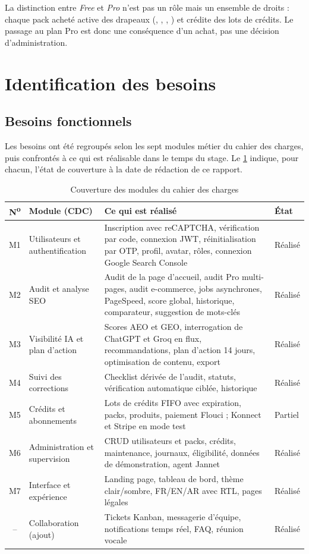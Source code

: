 La distinction entre \textit{Free} et \textit{Pro} n'est pas un rôle mais un ensemble de droits : chaque pack acheté active des drapeaux (, , , ) et crédite des lots de crédits. Le passage au plan Pro est donc une conséquence d'un achat, pas une décision d'administration.

\section{Identification des besoins}

\subsection{Besoins fonctionnels}
Les besoins ont été regroupés selon les sept modules métier du cahier des charges, puis confrontés à ce qui est réalisable dans le temps du stage. Le \cref{tab-modules-cdc} indique, pour chacun, l'état de couverture à la date de rédaction de ce rapport.

\begin{table}[htbp]
\centering
\small
\caption{Couverture des modules du cahier des charges}\label{tab-modules-cdc}
\begin{tabularx}{\textwidth}{@{}clXl@{}}
\toprule
\textbf{N\textsuperscript{o}} & \textbf{Module (CDC)} & \textbf{Ce qui est réalisé} & \textbf{État}\\
\midrule
M1 & Utilisateurs et authentification & Inscription avec reCAPTCHA, vérification par code, connexion JWT, réinitialisation par OTP, profil, avatar, rôles, connexion Google Search Console & Réalisé\\
M2 & Audit et analyse SEO & Audit de la page d'accueil, audit Pro multi-pages, audit e-commerce, jobs asynchrones, PageSpeed, score global, historique, comparateur, suggestion de mots-clés & Réalisé\\
M3 & Visibilité IA et plan d'action & Scores AEO et GEO, interrogation de ChatGPT et Groq en flux, recommandations, plan d'action 14 jours, optimisation de contenu, export & Réalisé\\
M4 & Suivi des corrections & Checklist dérivée de l'audit, statuts, vérification automatique ciblée, historique & Réalisé\\
M5 & Crédits et abonnements & Lots de crédits FIFO avec expiration, packs, produits, paiement Flouci ; Konnect et Stripe en mode test & Partiel\\
M6 & Administration et supervision & CRUD utilisateurs et packs, crédits, maintenance, journaux, éligibilité, données de démonstration, agent Jannet & Réalisé\\
M7 & Interface et expérience & Landing page, tableau de bord, thème clair/sombre, FR/EN/AR avec RTL, pages légales & Réalisé\\
\midrule
-- & Collaboration (ajout) & Tickets Kanban, messagerie d'équipe, notifications temps réel, FAQ, réunion vocale & Réalisé\\
\bottomrule
\end{tabularx}
\end{table}

